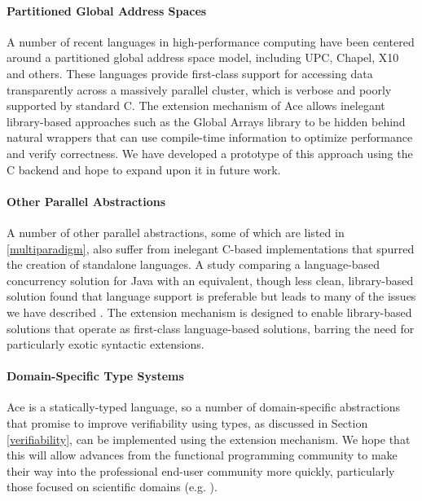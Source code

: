 \documentclass{sig-alternate}
\begin{document}
\paragraph{Partitioned Global Address Spaces}
A number of recent languages in high-performance computing have been centered around a partitioned global address space model, including UPC, Chapel, X10 and others. These languages provide first-class support for accessing data transparently across a massively parallel cluster, which is verbose and poorly supported by standard C. The extension mechanism of Ace allows inelegant library-based approaches such as the Global Arrays library to be hidden behind natural wrappers that can use compile-time information to optimize performance and verify correctness. We have developed a prototype of this approach using the C backend and hope to expand upon it in future work.

\paragraph{Other Parallel Abstractions}
A number of other parallel abstractions, some of which are listed in \ref{multiparadigm}, also suffer from inelegant C-based implementations that spurred the creation of standalone languages. A study comparing a language-based concurrency solution for Java with an equivalent, though less clean, library-based solution found that language support is preferable but leads to many of the issues we have described \cite{cave2010comparing}. The extension mechanism is designed to enable library-based solutions that operate as first-class language-based solutions, barring the need for particularly exotic syntactic extensions.

\paragraph{Domain-Specific Type Systems}
Ace is a statically-typed language, so a number of domain-specific abstractions that promise to improve verifiability using types, as discussed in Section \ref{verifiability}, can be implemented using the extension mechanism. We hope that this will allow advances from the functional programming community to make their way into the professional end-user community more quickly, particularly those focused on scientific domains (e.g. \cite{conf/cefp/Kennedy09}).
\end{document}
